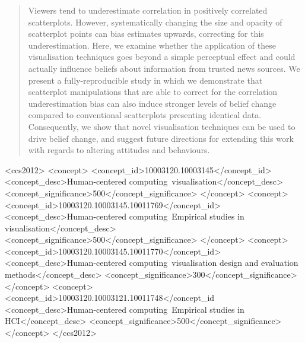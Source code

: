 \documentclass[sigconf]{acmart}
\begin{document}
\renewcommand{\shortauthors}{Strain et al.}

\begin{abstract}
Viewers tend to underestimate correlation in positively correlated
scatterplots. However, systematically changing the size and opacity of
scatterplot points can bias estimates upwards, correcting for this
underestimation. Here, we examine whether the application of these
visualisation techniques goes beyond a simple perceptual effect and
could actually influence beliefs about information from trusted news
sources. We present a fully-reproducible study in which we demonstrate
that scatterplot manipulations that are able to correct for the
correlation underestimation bias can also induce stronger levels of
belief change compared to conventional scatterplots presenting identical
data. Consequently, we show that novel visualisation techniques can be
used to drive belief change, and suggest future directions for extending
this work with regards to altering attitudes and behaviours.    
\end{abstract}

\begin{CCSXML}
<ccs2012>
 <concept>
  <concept_id>10003120.10003145</concept_id>
  <concept_desc>Human-centered computing~visualisation</concept_desc>
  <concept_significance>500</concept_significance>
 </concept>
 <concept>
  <concept_id>10003120.10003145.10011769</concept_id>
  <concept_desc>Human-centered computing~Empirical studies in visualisation</concept_desc>
  <concept_significance>500</concept_significance>
 </concept>
 <concept>
  <concept_id>10003120.10003145.10011770</concept_id>
  <concept_desc>Human-centered computing~visualisation design and evaluation methods</concept_desc>
  <concept_significance>300</concept_significance>
 </concept>
 <concept>
  <concept_id>10003120.10003121.10011748</concept_id
  <concept_desc>Human-centered computing~Empirical studies in HCI</concept_desc>
  <concept_significance>500</concept_significance>
 </concept>
</ccs2012>
\end{CCSXML}
\end{document}
